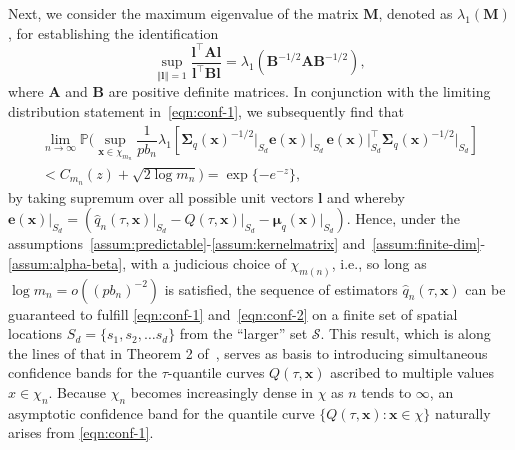 \documentclass[aos]{imsart}
\theoremstyle{plain}
\theoremstyle{remark}
\newcommand{\Scal}{\mathcal{S}}
\newcommand{\norm}[1]{\left\Vert #1 \right\Vert}
\newcommand{\bb}[1]{\boldsymbol{#1}}
\newcommand{\tr}{^{\intercal}}
\newcommand{\prob}{\mathbb{P}}
\newcommand{\cnam}[1]{\textcolor{mypurple}{#1}}
\begin{document}
Next, we consider the maximum eigenvalue of the matrix $\bb{M}$, denoted as $\lambda_1(\bb{M})$, for establishing the identification
\begin{equation*}
    \sup_{\norm{\bb{l}} = 1} \dfrac{\bb{l}\tr \bb{A}\bb{l}}{\bb{l}\tr \bb{B}\bb{l}} =  \lambda_1 \left(\bb{B}^{-1/2}\bb{A}\bb{B}^{-1/2} \right),
\end{equation*}
where $\bb{A}$ and $\bb{B}$ are positive definite matrices. In conjunction with the limiting distribution statement in~\eqref{eqn:conf-1}, we subsequently find that
\begin{multline}
    \lim_{n\rightarrow \infty} \prob\biggl( \sup_{\bb{x} \in \chi_{m_{n}}} \dfrac{1}{pb_n}\lambda_1\left[\bb{\Sigma}_q(\bb{x})^{-1/2}\vert_{S_d} \bb{e}(\bb{x})\vert_{S_d}\, \bb{e}(\bb{x})\vert_{S_d}\tr \bb{\Sigma}_q(\bb{x})^{-1/2}\vert_{S_d} \right] \\ < C_{m_n}(z) + \sqrt{2 \log m_{n}}\biggr) = \exp\{  -e^{-z}\},
    \label{eqn:conf-2}
\end{multline}
by taking supremum over all possible unit vectors $\bb{l}$ and whereby $\bb{e}(\bb{x})\vert_{S_d} = (\hat{q}_n(\tau, \bb{x})\vert_{S_d} - Q(\tau, \bb{x})\vert_{S_d} - \bb{\mu}_q(\bb{x})\vert_{S_d} )$. Hence, under the \cnam{assumptions~\ref{assum:predictable}-\ref{assum:kernelmatrix} and~\ref{assum:finite-dim}-\ref{assum:alpha-beta}, with a judicious choice of $\chi_{m(n)}$, i.e., so long as $\log m_n = o \left(  (p b_n )^{-2}\right)$ is satisfied,
the sequence of estimators $\hat{q}_n(\tau, \bb{x})$ can be guaranteed to fulfill} \eqref{eqn:conf-1} and~\eqref{eqn:conf-2} on a finite set of spatial locations $S_d = \{ s_1, s_2, \dots s_d \}$ from the ``larger'' set $\Scal$. This result, which is along the lines of that in Theorem 2 of~\cite{zhao2008confidence}, serves as basis to introducing simultaneous confidence bands for the $\tau$-quantile curves $Q(\tau, \bb{x})$ ascribed to multiple values $x \in \chi_n$. Because $\chi_n$ becomes increasingly dense in $\chi$ as $n$ tends to $\infty$, an asymptotic confidence band for the quantile curve $\{Q(\tau, \bb{x}): \bb{x} \in \chi\}$ naturally arises from \eqref{eqn:conf-1}.
\end{document}
